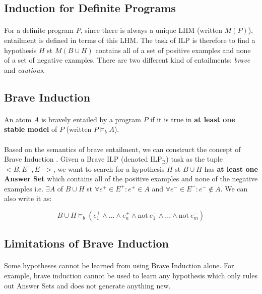 \documentclass{article}
\theoremstyle{plain}
\theoremstyle{definition}
\begin{document}
\begin{multicols}{2}
\subsection{Induction for Definite Programs}

\paragraph{} For a definite program $P$, since there is always a unique LHM (written $M(P)$), entailment is defined in terms of this LHM. The task of ILP is therefore to find a hypothesis $H$ st $M(B \cup H)$ contains all of a set of positive examples and none of a set of negative examples. There are two different kind of entailments: \textit{brave} and \textit{cautious}. 

\subsection{Brave Induction}
\paragraph{} An atom $A$ is bravely entailed by a program $P$ if it is true in \textbf{at least one stable model} of $P$ (written $P \models_b A$).

\paragraph{} Based on the semantics of brave entailment, we can construct the concept of Brave Induction  \cite{sakama08}. Given a Brave ILP (denoted $\text{ILP}_\text{B}$) task as the tuple $<B, E^+, E^->$, we want to search for a hypothesis $H$ st $B \cup H$ has \textbf{at least one Answer Set} which contains all of the positive examples and none of the negative examples i.e. $\exists A$ of $B \cup H$ st $\forall e^+ \in E^+: e^+ \in A$ and $\forall e^- \in E^-: e^- \not\in A$. We can also write it as:

$$B \cup H \models_b (e_1^+ \land ... \land e_n^+ \land \text{not}\ e_1^- \land ...  \land \text{not}\ e_m^-)$$

\subsection{Limitations of Brave Induction}\label{sec:BraveInductionLimitations}

\paragraph{} Some hypotheses cannot be learned from using Brave Induction alone. For example, brave induction cannot be used to learn any hypothesis which only rules out Answer Sets and does not generate anything new.


\end{multicols}
\end{document}
